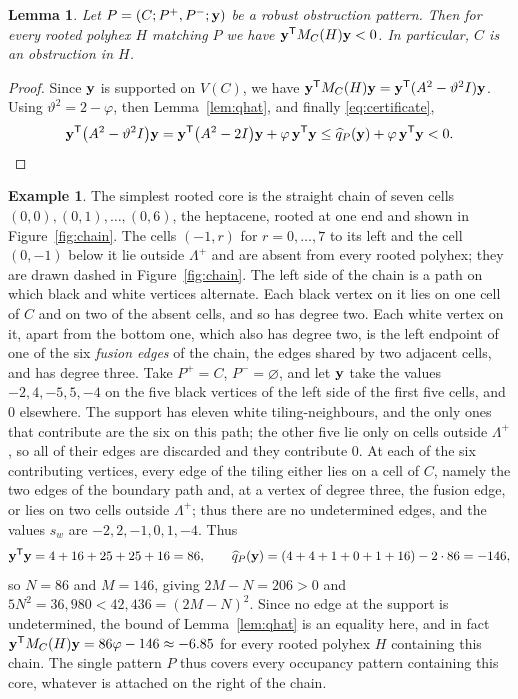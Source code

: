 \documentclass[11pt]{article}
\newcommand\vphi{\varphi}
\newcommand\thetaG{\vartheta}
\newcommand\tp{^{\mathsf T}}
\newtheorem{lemma}[theorem]{Lemma}
\theoremstyle{definition}
\newtheorem{example}[theorem]{Example}
\begin{document}
\begin{lemma}\label{lem:pattern-works}
Let $P=(C;P^{+},P^{-};{\mathbf y})$ be a robust obstruction pattern.  Then for every
rooted polyhex $H$ matching $P$ we have $\Zy\tp M_C(H)\Zy<0$.  In
particular, $C$ is an obstruction in $H$.
\end{lemma}

\begin{proof}
Since ${\mathbf y}$ is supported on $V(C)$, we have
$\Zy\tp M_C(H)\Zy=\Zy\tp(A^2-\thetaG^2I)\Zy$.  Using $\thetaG^2=2-\vphi$,
then Lemma~\ref{lem:qhat}, and finally \eqref{eq:certificate},
\[
 \Zy\tp\bigl(A^{2}-\thetaG^{2}I\bigr)\Zy
 =\Zy\tp\bigl(A^{2}-2I\bigr)\Zy+\vphi\,\Zy\tp\Zy
 \le\widehat q_P(\Zy)+\vphi\,\Zy\tp\Zy
 <0 .\qedhere
\]
\end{proof}

\begin{example}\label{ex:chain}
The simplest rooted core is the straight chain of seven cells
$(0,0),(0,1),\ldots,(0,6)$, the heptacene, rooted at one end and shown in
Figure~\ref{fig:chain}.  The cells $(-1,r)$ for $r=0,\ldots,7$ to its left
and the cell $(0,-1)$ below it lie outside $\Lambda^{+}$ and are absent from
every rooted polyhex; they are drawn dashed in Figure~\ref{fig:chain}.  The
left side of the chain is a path on which black and white vertices
alternate.  Each black vertex on it lies on one cell of $C$ and on two of the
absent cells, and so has degree two.  Each white vertex on it, apart from the
bottom one, which also has degree two, is the left endpoint of one of the six
\textsl{fusion edges} of the chain, the edges shared by two adjacent cells,
and has degree three.  Take
$P^{+}=C$, $P^{-}=\varnothing$, and let ${\mathbf y}$ take the values $-2,4,-5,5,-4$
on the five black vertices of the left side of the first five cells, and $0$
elsewhere.  The support has eleven white tiling-neighbours, and the only ones
that contribute are the six on this path; the other five lie only on cells
outside $\Lambda^{+}$, so all of their edges are discarded and they contribute
$0$.  At each of the six contributing vertices, every edge of the tiling
either lies on a cell of $C$, namely the two edges of the boundary path and,
at a vertex of degree three, the fusion edge, or lies on two cells outside
$\Lambda^{+}$; thus there are no
undetermined edges, and the values $s_w$ are $-2,2,-1,0,1,-4$.  Thus
\[
 \Zy\tp\Zy=4+16+25+25+16=86,\qquad
 \widehat q_P(\Zy)=(4+4+1+0+1+16)-2\cdot86=-146,
\]
so $N=86$ and $M=146$, giving $2M-N=206>0$ and
$5N^{2}=36{,}980<42{,}436=(2M-N)^{2}$.  Since no edge at
the support is undetermined, the bound of Lemma~\ref{lem:qhat} is an
equality here, and in fact $\Zy\tp M_C(H)\Zy=86\vphi-146\approx-6.85$ for
every rooted polyhex $H$ containing this chain.  The single pattern $P$ thus
covers every occupancy pattern containing this core, whatever is attached on
the right of the chain.
\end{example}
\end{document}
